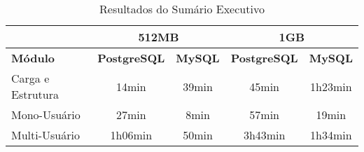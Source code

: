 \begin{table}[H]
    \centering
    \caption{Resultados do Sumário Executivo
    \label{tab:comparisonMySql}}
\begin{tabular}{l|c|c|c|c|}
\cline{2-5}
 & \multicolumn{2}{c|}{\textbf{512MB}} & \multicolumn{2}{c|}{\textbf{1GB}} \\ \hline
\multicolumn{1}{|l|}{\textbf{Módulo}} & \textbf{PostgreSQL} & \textbf{MySQL} & \textbf{PostgreSQL} & \textbf{MySQL} \\ \hline
\multicolumn{1}{|l|}{Carga e Estrutura} & 14min & 39min & 45min & 1h23min \\ \hline
\multicolumn{1}{|l|}{Mono-Usuário} & 27min & 8min & 57min & 19min \\ \hline
\multicolumn{1}{|l|}{Multi-Usuário} & 1h06min & 50min & 3h43min & 1h34min \\ \hline
\end{tabular}
\end{table}


